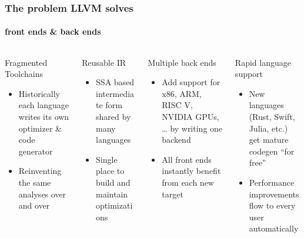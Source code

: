 \documentclass[aspectratio=169]{beamer}
\begin{document}
\begin{frame}
	\frametitle{The problem LLVM solves}
	\framesubtitle{front ends \& back ends}

	\begin{columns}[T]
		\begin{column}{0.25\textwidth}
			Fragmented Toolchains
			\begin{itemize}
				\item Historically each language writes its own optimizer \& code generator
				\item Reinventing the same analyses over and over
			\end{itemize}
		\end{column}
		\begin{column}{0.25\textwidth}
			Reusable IR
			\begin{itemize}
				\item SSA based intermediate form shared by many languages
				\item Single place to build and maintain optimizations
			\end{itemize}
		\end{column}
		\begin{column}{0.25\textwidth}
			Multiple back ends
			\begin{itemize}
				\item Add support for x86, ARM, RISC V, NVIDIA GPUs, … by writing one backend
				\item All front ends instantly benefit from each new target
			\end{itemize}
		\end{column}
		\begin{column}{0.25\textwidth}
			Rapid language support
			\begin{itemize}
				\item New languages (Rust, Swift, Julia, etc.) get mature codegen “for free”
				\item Performance improvements flow to every user automatically
			\end{itemize}
		\end{column}
	\end{columns}
\end{frame}
\end{document}
